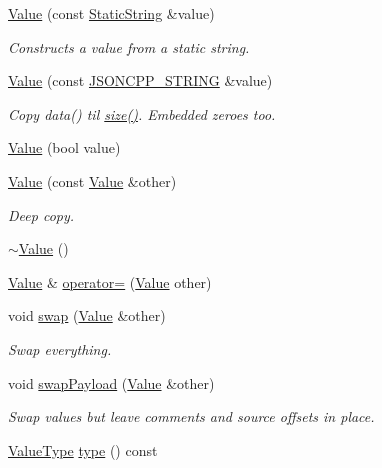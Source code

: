 \begin{DoxyCompactItemize}
\hyperlink{class_json_1_1_value_a081830e95f88a37054da7e46c65b0766}{Value} (const \hyperlink{class_json_1_1_static_string}{Static\+String} \&value)
\begin{DoxyCompactList}\small\item\em Constructs a value from a static string. \end{DoxyCompactList}\item 
\hyperlink{class_json_1_1_value_a89ef37969ff7c6eb3a7afcca03d4cd4a}{Value} (const \hyperlink{config_8h_a1e723f95759de062585bc4a8fd3fa4be}{J\+S\+O\+N\+C\+P\+P\+\_\+\+S\+T\+R\+I\+NG} \&value)
\begin{DoxyCompactList}\small\item\em Copy data() til \hyperlink{class_json_1_1_value_a0ec2808e1d7efa4e9fad938d6667be44}{size()}. Embedded zeroes too. \end{DoxyCompactList}\item 
\hyperlink{class_json_1_1_value_a350a31ea4a30d384994b0bc010b17495}{Value} (bool value)
\item 
\hyperlink{class_json_1_1_value_a436dfd3670f95fd665f680eba5cebcf0}{Value} (const \hyperlink{class_json_1_1_value}{Value} \&other)
\begin{DoxyCompactList}\small\item\em Deep copy. \end{DoxyCompactList}\item 
\hyperlink{class_json_1_1_value_a287dea48da3912d02756735bf677b27b}{$\sim$\+Value} ()
\item 
\hyperlink{class_json_1_1_value}{Value} \& \hyperlink{class_json_1_1_value_a795acb28772da4c5d85ae8f4af36c69f}{operator=} (\hyperlink{class_json_1_1_value}{Value} other)
\item 
void \hyperlink{class_json_1_1_value_aab841120d78e296e1bc06a373345e822}{swap} (\hyperlink{class_json_1_1_value}{Value} \&other)
\begin{DoxyCompactList}\small\item\em Swap everything. \end{DoxyCompactList}\item 
void \hyperlink{class_json_1_1_value_a5263476047f20e2fc6de470e4de34fe5}{swap\+Payload} (\hyperlink{class_json_1_1_value}{Value} \&other)
\begin{DoxyCompactList}\small\item\em Swap values but leave comments and source offsets in place. \end{DoxyCompactList}\item 
\hyperlink{namespace_json_a7d654b75c16a57007925868e38212b4e}{Value\+Type} \hyperlink{class_json_1_1_value_a8ce61157a011894f0252ceed232312de}{type} () const

\end{DoxyCompactItemize}
